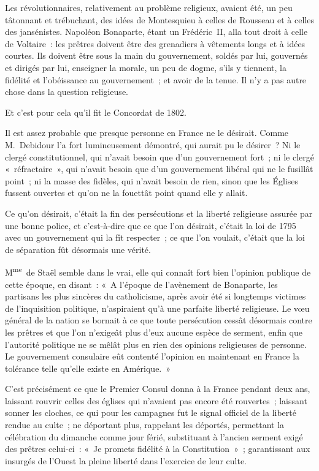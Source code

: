 \documentclass[french,twoside]{book} %
\begin{document}
\noindent Les révolutionnaires, relativement au problème religieux, avaient été, un peu tâtonnant et trébuchant, des idées de Montesquieu à celles de Rousseau et à celles des jansénistes. Napoléon Bonaparte, étant un Frédéric II, alla tout droit à celle de Voltaire : les prêtres doivent être des grenadiers à vêtements longs et à idées courtes. Ils doivent être sous la main du gouvernement, soldés par lui, gouvernés et dirigés par lui, enseigner la morale, un peu de dogme, s’ils y tiennent, la fidélité et l’obéissance au gouvernement ; et avoir de la tenue. Il n’y a pas autre chose dans la question religieuse.\par
Et c’est pour cela qu’il fit le Concordat de 1802.\par
Il est assez probable que presque personne en France ne le désirait. Comme M. Debidour l’a  fort lumineusement démontré, qui aurait pu le désirer ? Ni le clergé constitutionnel, qui n’avait besoin que d’un gouvernement fort ; ni le clergé « réfractaire », qui n’avait besoin que d’un gouvernement libéral qui ne le fusillât point ; ni la masse des fidèles, qui n’avait besoin de rien, sinon que les Églises fussent ouvertes et qu’on ne la fouettât point quand elle y allait.\par
Ce qu’on désirait, c’était la fin des persécutions et la liberté religieuse assurée par une bonne police, et c’est-à-dire que ce que l’on désirait, c’était la loi de 1795 avec un gouvernement qui la fît respecter ; ce que l’on voulait, c’était que la loi de séparation fût désormais une vérité.\par
M\textsuperscript{me} de Staël semble dans le vrai, elle qui connaît fort bien l’opinion publique de cette époque, en disant : « A l’époque de l’avènement de Bonaparte, les partisans les plus sincères du catholicisme, après avoir été si longtemps victimes de l’inquisition politique, n’aspiraient qu’à une parfaite liberté religieuse. Le vœu général de la nation se bornait à ce que toute persécution cessât désormais contre les prêtres et que l’on n’exigeât plus d’eux aucune espèce de serment, enfin que l’autorité politique ne se mêlât plus en rien des opinions religieuses de personne. Le gouvernement consulaire eût contenté l’opinion en maintenant  en France la tolérance telle qu’elle existe en Amérique. »\par
C’est précisément ce que le Premier Consul donna à la France pendant deux ans, laissant rouvrir celles des églises qui n’avaient pas encore été rouvertes ; laissant sonner les cloches, ce qui pour les campagnes fut le signal officiel de la liberté rendue au culte ; ne déportant plus, rappelant les déportés, permettant la célébration du dimanche comme jour férié, substituant à l’ancien serment exigé des prêtres celui-ci : « Je promets fidélité à la Constitution » ; garantissant aux insurgés de l’Ouest la pleine liberté dans l’exercice de leur culte.\par
\end{document}
